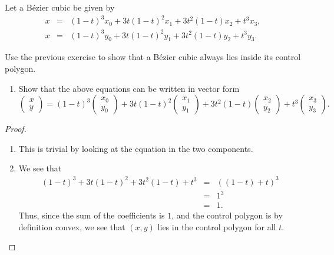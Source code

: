 \begin{exercise}
    Let a B\'ezier cubic be given by
    \begin{eqnarray*}
        x & = & (1-t)^3 x_0 + 3t(1-t)^2 x_1 + 3t^2 (1-t) x_2 + t^3 x_3,\\
        x & = & (1-t)^3 y_0 + 3t(1-t)^2 y_1 + 3t^2 (1-t) y_2 + t^3 y_3.        
    \end{eqnarray*}
    \item Use the previous exercise to show that a B\'ezier cubic always lies inside its control polygon.
    \begin{enumerate}
        \item Show that the above equations can be written in vector form
        $$\left(\begin{array}{c} x\\ y\end{array}\right) = (1-t)^3 \left(\begin{array}{c} x_0\\ y_0\end{array}\right) + 3t(1-t)^2\left(\begin{array}{c} x_1\\ y_1\end{array}\right) + 3t^2 (1-t) \left(\begin{array}{c} x_2\\ y_2\end{array}\right) + t^3 \left(\begin{array}{c} x_3\\ y_3\end{array}\right).$$
    \end{enumerate}
\end{exercise}
\begin{proof}
    \begin{enumerate}
        \item This is trivial by looking at the equation in the two components. 
        \item We see that
        \begin{eqnarray*}
            (1-t)^3 + 3t(1-t)^2 + 3t^2 (1-t) + t^3
            & = & ( (1-t) + t)^3\\
            & = & 1^3\\
            & = & 1.
        \end{eqnarray*}
        Thus, since the sum of the coefficients is $1$, and the control polygon is by definition convex, we see that $(x,y)$ lies in the control polygon for all $t$.
    \end{enumerate}
\end{proof}

